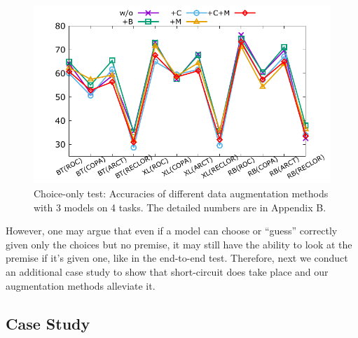 %
\begin{figure}[th]
    \centering
    \includegraphics[width=0.7\columnwidth]{data/choice-only.pdf}
    \caption{Choice-only test: Accuracies of different data augmentation methods with 3 models on 4 tasks. 
    The detailed numbers are in Appendix B.}
    \label{fig:choice-only}
\end{figure}

However, one may argue that even if a model can 
choose or ``guess'' correctly given only the choices but no premise, 
it may still have the ability to look at the premise if it's given one,
like in the end-to-end test.
Therefore, next we conduct an additional case study to show that short-circuit
does take place and our augmentation methods alleviate it.

\subsection{Case Study}
\label{sec:case}

